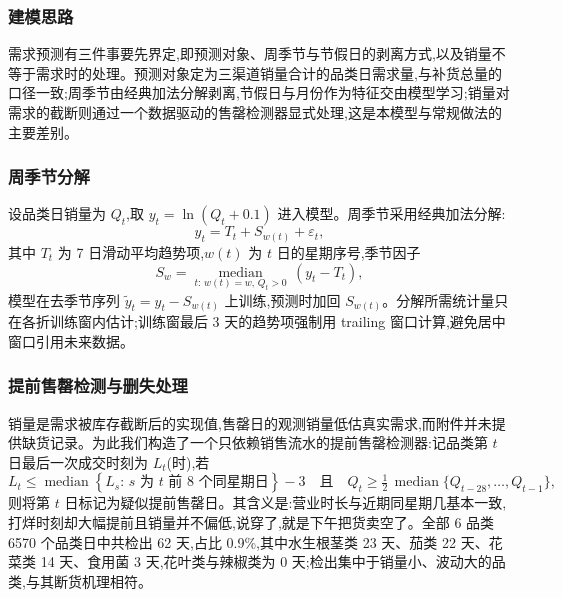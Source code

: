 \subsubsection{建模思路}

需求预测有三件事要先界定,即预测对象、周季节与节假日的剥离方式,以及销量不等于需求时的处理。预测对象定为三渠道销量合计的品类日需求量,与补货总量的口径一致;周季节由经典加法分解剥离,节假日与月份作为特征交由模型学习;销量对需求的截断则通过一个数据驱动的售罄检测器显式处理,这是本模型与常规做法的主要差别。

\subsubsection{周季节分解}

设品类日销量为 $Q_t$,取 $y_t=\ln(Q_t+0.1)$ 进入模型。周季节采用经典加法分解:
\begin{equation}
  y_t = T_t + S_{w(t)} + \varepsilon_t,
\end{equation}
其中 $T_t$ 为 7 日滑动平均趋势项,$w(t)$ 为 $t$ 日的星期序号,季节因子
\begin{equation}
  S_w = \operatorname*{median}_{t:\,w(t)=w,\,Q_t>0}\,\left(y_t - T_t\right),
\end{equation}
模型在去季节序列 $\tilde{y}_t = y_t - S_{w(t)}$ 上训练,预测时加回 $S_{w(t)}$。分解所需统计量只在各折训练窗内估计;训练窗最后 3 天的趋势项强制用 trailing 窗口计算,避免居中窗口引用未来数据。

\subsubsection{提前售罄检测与删失处理}
\label{subsec:censor}

销量是需求被库存截断后的实现值,售罄日的观测销量低估真实需求,而附件并未提供缺货记录。为此我们构造了一个只依赖销售流水的提前售罄检测器:记品类第 $t$ 日最后一次成交时刻为 $L_t$(时),若
\begin{equation}
  L_t \le \operatorname*{median}\left\{L_{s}:\, s \text{ 为 } t \text{ 前 8 个同星期日}\right\} - 3
  \quad\text{且}\quad
  Q_t \ge \tfrac{1}{2}\,\operatorname*{median}\{Q_{t-28},\dots,Q_{t-1}\},
  \label{eq:censor}
\end{equation}
则将第 $t$ 日标记为疑似提前售罄日。其含义是:营业时长与近期同星期几基本一致,打烊时刻却大幅提前且销量并不偏低,说穿了,就是下午把货卖空了。全部 6 品类 6570 个品类日中共检出 62 天,占比 0.9\%,其中水生根茎类 23 天、茄类 22 天、花菜类 14 天、食用菌 3 天,花叶类与辣椒类为 0 天;检出集中于销量小、波动大的品类,与其断货机理相符。

